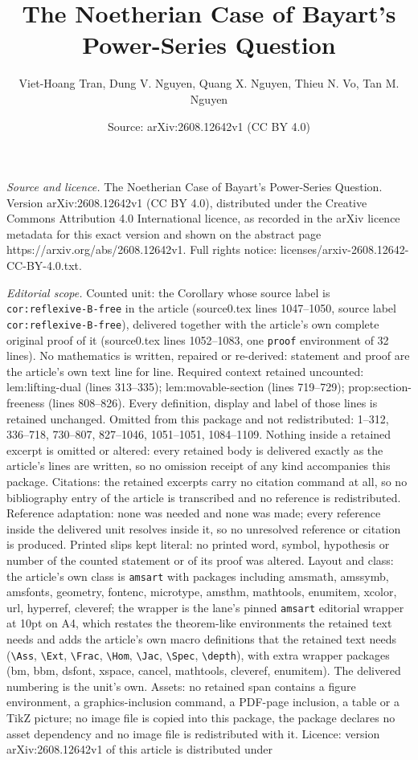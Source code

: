 \documentclass[10pt,a4paper]{amsart}
\title[The Noetherian Case of Bayart's Power-Series Question]{The Noetherian Case of Bayart's Power-Series Question}
\author{Viet-Hoang Tran, Dung V. Nguyen, Quang X. Nguyen, Thieu N. Vo, Tan M. Nguyen}
\date{Source: arXiv:2608.12642v1 (CC BY 4.0)}
\begin{document}
\maketitle

\noindent\emph{Source and licence.} The Noetherian Case of Bayart's Power-Series Question. Version arXiv:2608.12642v1 (CC BY 4.0), distributed under the Creative Commons Attribution 4.0 International licence, as recorded in the arXiv licence metadata for this exact version and shown on the abstract page https://arxiv.org/abs/2608.12642v1. Full rights notice: licenses/arxiv-2608.12642-CC-BY-4.0.txt.\par\smallskip

\noindent\textit{Editorial scope.} Counted unit: the Corollary whose source label is \texttt{cor:reflexive-B-free} in the article (source0.tex lines 1047--1050, source label \texttt{cor:reflexive-B-free}), delivered together with the article's own complete original proof of it (source0.tex lines 1052--1083, one \texttt{proof} environment of 32 lines). No mathematics is written, repaired or re-derived: statement and proof are the article's own text line for line. Required context retained uncounted: lem:lifting-dual (lines 313--335); lem:movable-section (lines 719--729); prop:section-freeness (lines 808--826). Every definition, display and label of those lines is retained unchanged. Omitted from this package and not redistributed: 1--312, 336--718, 730--807, 827--1046, 1051--1051, 1084--1109. Nothing inside a retained excerpt is omitted or altered: every retained body is delivered exactly as the article's lines are written, so no omission receipt of any kind accompanies this package. Citations: the retained excerpts carry no citation command at all, so no bibliography entry of the article is transcribed and no reference is redistributed. Reference adaptation: none was needed and none was made; every reference inside the delivered unit resolves inside it, so no unresolved reference or citation is produced. Printed slips kept literal: no printed word, symbol, hypothesis or number of the counted statement or of its proof was altered. Layout and class: the article's own class is \texttt{amsart} with packages including amsmath, amssymb, amsfonts, geometry, fontenc, microtype, amsthm, mathtools, enumitem, xcolor, url, hyperref, cleveref; the wrapper is the lane's pinned \texttt{amsart} editorial wrapper at 10pt on A4, which restates the theorem-like environments the retained text needs and adds the article's own macro definitions that the retained text needs (\texttt{\textbackslash Ass}, \texttt{\textbackslash Ext}, \texttt{\textbackslash Frac}, \texttt{\textbackslash Hom}, \texttt{\textbackslash Jac}, \texttt{\textbackslash Spec}, \texttt{\textbackslash depth}), with extra wrapper packages (bm, bbm, dsfont, xspace, cancel, mathtools, cleveref, enumitem). The delivered numbering is the unit's own. Assets: no retained span contains a figure environment, a graphics-inclusion command, a PDF-page inclusion, a table or a TikZ picture; no image file is copied into this package, the package declares no asset dependency and no image file is redistributed with it. Licence: version arXiv:2608.12642v1 of this article is distributed under 
\end{document}
